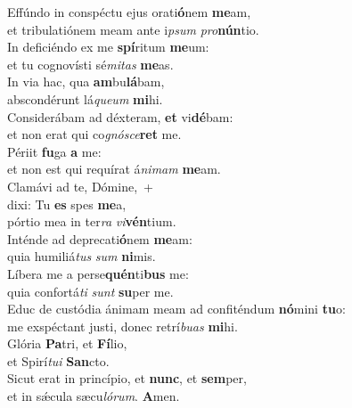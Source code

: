 \evenverse Effúndo in conspéctu ejus orati\textbf{ó}nem \textbf{me}am,~\*\\
\evenverse et tribulatiónem meam ante i\textit{psum} \textit{pro}\textbf{nún}tio.\\
\oddverse In deficiéndo ex me \textbf{spí}ritum \textbf{me}um:~\*\\
\oddverse et tu cognovísti sé\textit{mi}\textit{tas} \textbf{me}as.\\
\evenverse In via hac, qua \textbf{am}bu\textbf{lá}bam,~\*\\
\evenverse abscondérunt lá\textit{que}\textit{um} \textbf{mi}hi.\\
\oddverse Considerábam ad déxteram, \textbf{et} vi\textbf{dé}bam:~\*\\
\oddverse et non erat qui co\textit{gnó}\textit{sce}\textbf{ret} me.\\
\evenverse Périit \textbf{fu}ga \textbf{a} me:~\*\\
\evenverse et non est qui requírat á\textit{ni}\textit{mam} \textbf{me}am.\\
\oddverse Clamávi ad te, Dómine,~+\\
\oddverse  dixi: Tu \textbf{es} spes \textbf{me}a,~\*\\
\oddverse pórtio mea in ter\textit{ra} \textit{vi}\textbf{vén}tium.\\
\evenverse Inténde ad deprecati\textbf{ó}nem \textbf{me}am:~\*\\
\evenverse quia humiliá\textit{tus} \textit{sum} \textbf{ni}mis.\\
\oddverse Líbera me a perse\textbf{quén}ti\textbf{bus} me:~\*\\
\oddverse quia confortá\textit{ti} \textit{sunt} \textbf{su}per me.\\
\evenverse Educ de custódia ánimam meam ad confiténdum \textbf{nó}mini \textbf{tu}o:~\*\\
\evenverse me exspéctant justi, donec retrí\textit{bu}\textit{as} \textbf{mi}hi.\\
\oddverse Glória \textbf{Pa}tri, et \textbf{Fí}lio,~\*\\
\oddverse et Spirí\textit{tu}\textit{i} \textbf{San}cto.\\
\evenverse Sicut erat in princípio, et \textbf{nunc}, et \textbf{sem}per,~\*\\
\evenverse et in sǽcula sæcu\textit{ló}\textit{rum}. \textbf{A}men.\\
